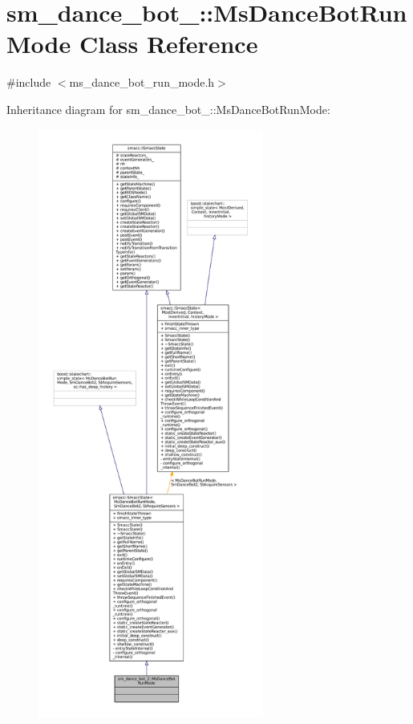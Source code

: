 \hypertarget{classsm__dance__bot__2_1_1MsDanceBotRunMode}{}\section{sm\+\_\+dance\+\_\+bot\+\_\+:\+:Ms\+Dance\+Bot\+Run\+Mode Class Reference}
\label{classsm__dance__bot__2_1_1MsDanceBotRunMode}


{\ttfamily \#include $<$ms\+\_\+dance\+\_\+bot\+\_\+run\+\_\+mode.\+h$>$}



Inheritance diagram for sm\+\_\+dance\+\_\+bot\+\_\+:\+:Ms\+Dance\+Bot\+Run\+Mode\+:
\nopagebreak
\begin{figure}[H]
\begin{center}
\leavevmode
\includegraphics[height=550pt]{classsm__dance__bot__2_1_1MsDanceBotRunMode__inherit__graph}
\end{center}
\end{figure}


